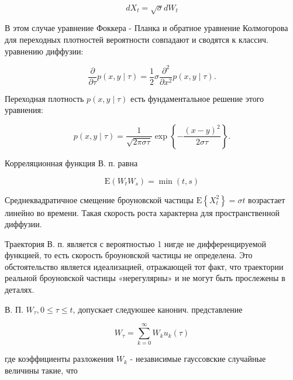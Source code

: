 \documentclass[10pt]{article}
\begin{document}
\[

d X_{t}=\sqrt{\sigma} d W_{t}

\]



В этом случае уравнение Фоккера - Планка и обратное уравнение Колмогорова для переходных плотностей вероятности совпадают и сводятся к классич. уравнению диффузии:



\[

\frac{\partial}{\partial \tau} p(x, y \mid \tau)=\frac{1}{2} \sigma \frac{\partial^{2}}{\partial x^{2}} p(x, y \mid \tau) .

\]



Переходная плотность $p(x, y \mid \tau)$ есть фундаментальное решение этого уравнения:



\[

p(x, y \mid \tau)=\frac{1}{\sqrt{2 \pi \sigma \tau}} \exp \left\{-\frac{(x-y)^{2}}{2 \sigma \tau}\right\} .

\]



Корреляционная функция В. п. равна



\[

\mathrm{E}\left(W_{t} W_{s}\right)=\min (t, s)

\]



Среднеквадратичное смещение броуновской частицы $\mathrm{E}\left\{X_{t}^{2}\right\}=\sigma t$ возрастает линейно во времени. Такая скорость роста характерна для пространственной диффузии.



Траектория В. п. является с вероятностью 1 нигде не дифференцируемой функцией, то есть скорость броуновской частицы не определена. Это обстоятельство является идеализацией, отражающей тот факт, что траектории реальной броуновской частицы «нерегулярны» и не могут быть прослежены в деталях.



В. П. $W_{\tau}, 0 \leqslant \tau \leqslant t$, допускает следуюшее канонич. представление



\[

W_{\tau}=\sum_{k=0}^{\infty} W_{k} u_{k}(\tau)

\]



где коэффициенты разложения $W_{k}$ - независимые гауссовские случайные величины такие, что
\end{document}
